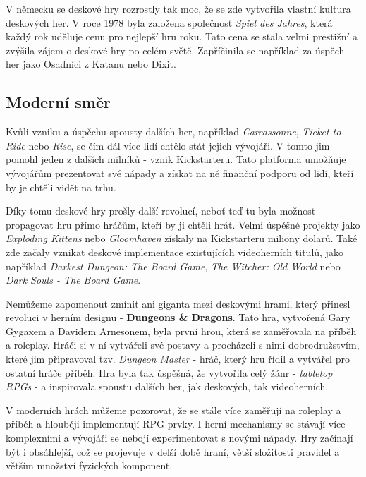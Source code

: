 V německu se deskové hry rozrostly tak moc, že se zde vytvořila vlastní kultura deskových her. V roce 1978 byla založena společnost \textit{Spiel des Jahres}, která každý rok uděluje cenu pro nejlepší hru roku. Tato cena se stala velmi prestižní a zvýšila zájem o deskové hry po celém světě. Zapříčinila se například za úspěch her jako Osadníci z Katanu nebo Dixit. \cite{attia_2018}

\subsection{Moderní směr}
\label{subsec:modern}

Kvůli vzniku a úspěchu spousty dalších her, například \textit{Carcassonne}, \textit{Ticket to Ride} nebo \textit{Risc}, se čím dál více lidí chtělo stát jejich vývojáři. V tomto jim pomohl jeden z dalších milníků - vznik Kickstarteru. Tato platforma umožňuje vývojářům prezentovat své nápady a získat na ně finanční podporu od lidí, kteří by je chtěli vidět na trhu.  \cite{attia_2018}

Díky tomu deskové hry prošly další revolucí, neboť teď tu byla možnost propagovat hru přímo hráčům, kteří by ji chtěli hrát. Velmi úspěšné projekty jako \textit{Exploding Kittens} nebo \textit{Gloomhaven} získaly na Kickstarteru miliony dolarů. Také zde začaly vznikat deskové implementace existujících videoherních titulů, jako například \textit{Darkest Dungeon: The Board Game}, \textit{The Witcher: Old World} nebo \textit{Dark Souls - The Board Game}. \cite{kickstarter}

Nemůžeme zapomenout zmínit ani giganta mezi deskovými hrami, který přinesl revoluci v herním designu - \textbf{Dungeons \& Dragons}. Tato hra, vytvořená Gary Gygaxem a Davidem Arnesonem, byla první hrou, která se zaměřovala na příběh a roleplay. Hráči si v ní vytvářeli své postavy a procházeli s nimi dobrodružstvím, které jim připravoval tzv. \textit{Dungeon Master} - hráč, který hru řídil a vytvářel pro ostatní hráče příběh. Hra byla tak úspěšná, že vytvořila celý žánr - \textit{tabletop RPGs} - a inspirovala spoustu dalších her, jak deskových, tak videoherních. \cite{dndbeyond_2023}

V moderních hrách můžeme pozorovat, že se stále více zaměřují na roleplay a příběh a hlouběji implementují RPG prvky. I herní mechanismy se stávají více komplexními a vývojáři se nebojí experimentovat s novými nápady. Hry začínají být i obsáhlejší, což se projevuje v delší době hraní, větší složitosti pravidel a větším množství fyzických komponent.